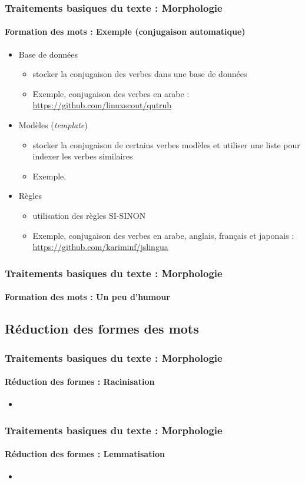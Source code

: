 \documentclass[xcolor=table]{beamer}
\begin{document}
\begin{frame}
\frametitle{Traitements basiques du texte : Morphologie}
\framesubtitle{Formation des mots : Exemple (conjugaison automatique)}

\begin{itemize}
	\item Base de données
	\begin{itemize}
		\item stocker la conjugaison des verbes dans une base de données
		\item Exemple, conjugaison des verbes en arabe : \url{https://github.com/linuxscout/qutrub}
	\end{itemize}
	\item Modèles (\textit{template})
	\begin{itemize}
		\item stocker la conjugaison de certains verbes modèles et utiliser une liste pour indexer les verbes similaires
		\item Exemple, 
	\end{itemize}
	\item Règles
	\begin{itemize}
		\item utilisation des règles SI-SINON
		\item Exemple, conjugaison des verbes en arabe, anglais, français et japonais : \url{https://github.com/kariminf/jslingua}
	\end{itemize}
\end{itemize}

\end{frame}

\begin{frame}
\frametitle{Traitements basiques du texte : Morphologie}
\framesubtitle{Formation des mots : Un peu d'humour}

\begin{center}
\end{center}

\end{frame}

\subsection{Réduction des formes des mots}

\begin{frame}
\frametitle{Traitements basiques du texte : Morphologie}
\framesubtitle{Réduction des formes : Racinisation}

\begin{itemize}
\item 
\end{itemize}

\end{frame}

\begin{frame}
\frametitle{Traitements basiques du texte : Morphologie}
\framesubtitle{Réduction des formes : Lemmatisation}

\begin{itemize}
	\item 
\end{itemize}

\end{frame}

\end{document}
